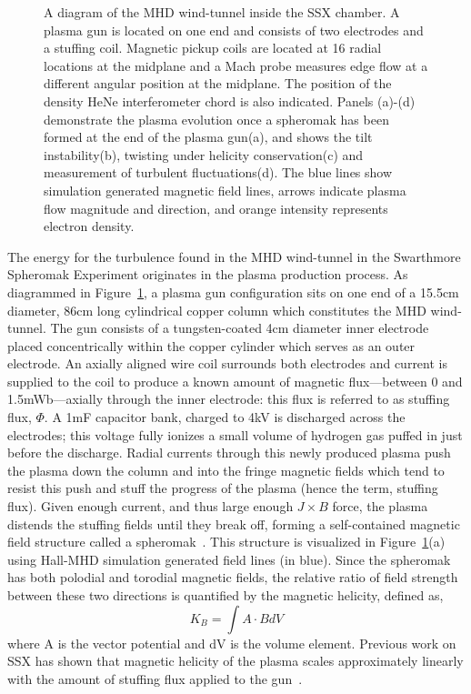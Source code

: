 \documentclass[preprint2]{aastex}
\begin{document}
\begin{figure}
\caption{\label{fig:moviestills} A diagram of the MHD wind-tunnel inside the SSX chamber. A plasma gun is located on one end and consists of two electrodes and a stuffing coil. Magnetic pickup coils are located at 16 radial locations at the midplane and a Mach probe measures edge flow at a different angular position at the midplane. The position of the density HeNe interferometer chord is also indicated. Panels (a)-(d) demonstrate the plasma evolution once a spheromak has been formed at the end of the plasma gun(a), and shows the tilt instability(b), twisting under helicity conservation(c) and measurement of turbulent fluctuations(d). The blue lines show simulation generated magnetic field lines, arrows indicate plasma flow magnitude and direction, and orange intensity represents electron density.}
\end{figure}

The energy for the turbulence found in the MHD wind-tunnel in the Swarthmore Spheromak Experiment originates in the plasma production process. As diagrammed in Figure~\ref{fig:moviestills}, a plasma gun configuration sits on one end of a 15.5cm diameter, 86cm long cylindrical copper column which constitutes the MHD wind-tunnel. The gun consists of a tungsten-coated 4cm diameter inner electrode placed concentrically within the copper cylinder which serves as an outer electrode. An axially aligned wire coil surrounds both electrodes and current is supplied to the coil to produce a known amount of magnetic flux---between 0 and 1.5mWb---axially through the inner electrode: this flux is referred to as stuffing flux, $\Phi$. A 1mF capacitor bank, charged to 4kV is discharged across the electrodes; this voltage fully ionizes a small volume of hydrogen gas puffed in just before the discharge. Radial currents through this newly produced plasma push the plasma down the column and into the fringe magnetic fields which tend to resist this push and stuff the progress of the plasma (hence the term, stuffing flux). Given enough current, and thus large enough $J\times B$ force, the plasma distends the stuffing fields until they break off, forming a self-contained magnetic field structure called a spheromak~\citep{bar86,jar94}. This structure is visualized in Figure~\ref{fig:moviestills}(a) using Hall-MHD simulation generated field lines (in blue). Since the spheromak has both polodial and torodial magnetic fields, the relative ratio of field strength between these two directions is quantified by the magnetic helicity, defined as,
\begin{equation}
K_{B} = \int A \cdot B dV
\label{eq:helicity_th}
\end{equation}
where A is the vector potential and dV is the volume element. Previous work on SSX has shown that magnetic helicity of the plasma scales approximately linearly with the amount of stuffing flux applied to the gun~\citep{sch14b}.
\end{document}
